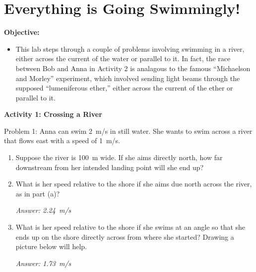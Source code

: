 \section{Everything is Going Swimmingly!}

\makelabheader %

\textbf{Objective:}
\begin{itemize}
\item This lab steps through a couple of problems involving swimming in a river, either across the current of the water or parallel to it.  In fact, the race between Bob and Anna in Activity 2 is analagous to the famous ``Michaelson and Morley'' experiment, which involved sending light beams through the supposed ``lumeniferous ether,'' either across the current of the ether or parallel to it.
\end{itemize}

\textbf{Activity 1: Crossing a River} 

Problem 1: Anna can swim 2~m/s in still water.  She wants to swim across a river that flows east with a speed of 1~m/s.

\begin{enumerate}[labparts]
\item Suppose the river is 100~m wide.  If she aims directly north, how far downstream from her intended landing point will she end up?
\answerspace{0.6in}

\item What is her speed relative to the shore if she aims due north across the river, as in part (a)?
\answerspace{0.6in}

\hspace{\fill}\textit{Answer: 2.24~m/s}

\item What is her speed relative to the shore if she swims at an angle so that she ends up on the shore directly across from where she started?  Drawing a picture below will help.
\answerspace{0.6in}

\hspace{\fill}\textit{Answer: 1.73~m/s}

\end{enumerate}

